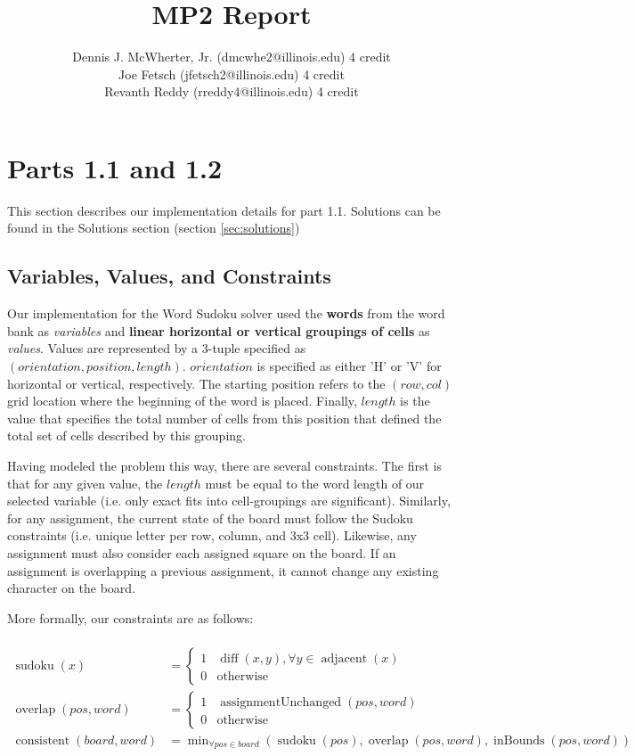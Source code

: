 \documentclass{article}
\author{Dennis J. McWherter, Jr. (dmcwhe2@illinois.edu) 4 credit \\
        Joe Fetsch (jfetsch2@illinois.edu) 4 credit \\
        Revanth Reddy (rreddy4@illinois.edu) 4 credit}
\title{MP2 Report}
\begin{document}
\maketitle

\section{Parts 1.1 and 1.2}

This section describes our implementation details for part 1.1. Solutions can be found in the Solutions section (section \ref{sec:solutions})

\subsection{Variables, Values, and Constraints}
Our implementation for the Word Sudoku solver used the \textbf{words} from the word bank as \emph{variables} and \textbf{linear horizontal or vertical groupings of cells} as \emph{values}. Values are represented by a 3-tuple specified as $(orientation, position, length)$. $orientation$ is specified as either 'H' or 'V' for horizontal or vertical, respectively. The starting position refers to the $(row, col)$ grid location where the beginning of the word is placed. Finally, $length$ is the value that specifies the total number of cells from this position that defined the total set of cells described by this grouping.

Having modeled the problem this way, there are several constraints. The first is that for any given value, the $length$ must be equal to the word length of our selected variable (i.e. only exact fits into cell-groupings are significant). Similarly, for any assignment, the current state of the board must follow the Sudoku constraints (i.e. unique letter per row, column, and 3x3 cell). Likewise, any assignment must also consider each assigned square on the board. If an assignment is overlapping a previous assignment, it cannot change any existing character on the board.

More formally, our constraints are as follows:
\\\\
$
\begin{aligned}
\operatorname{sudoku}(x) &=
  \begin{cases}
  1 & \operatorname{diff}(x, y), \forall y \in \operatorname{adjacent}(x) \\
  0 & \operatorname{otherwise}
  \end{cases} \\
\operatorname{overlap}(pos, word) &=
  \begin{cases}
  1 & \operatorname{assignmentUnchanged}(pos, word) \\
  0 & \operatorname{otherwise}
  \end{cases} \\
\operatorname{consistent}(board, word) &= \min_{\forall pos \in board}{(\operatorname{sudoku}(pos), \operatorname{overlap}(pos, word), \operatorname{inBounds}(pos, word))}
\end{aligned}$
\end{document}
